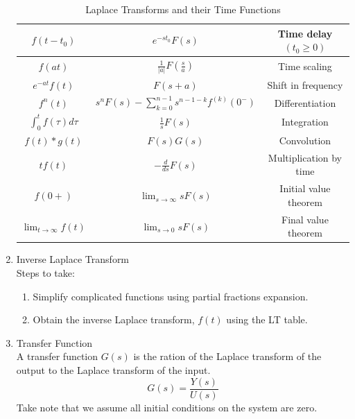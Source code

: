 \documentclass{article}
\begin{document}
\begin{enumerate}
\begin{table}[h]
\begin{center}
\begin{tabular}{|c|c|c|}
    $f(t - t_0)$ & $e^{-st_0}F(s)$ & Time delay $(t_0 \geq 0)$ \\ \hline
    $f(at)$ & $\displaystyle \frac{1}{|a|}F\left(\frac{s}{a}\right)$ & Time scaling  \\ \hline
    $e^{-at}f(t)$ & $F(s + a)$ & Shift in frequency \\ \hline
    $f^n(t)$ & $\displaystyle s^n F(s) - \sum_{k=0}^{n-1}s^{n-1-k}f^{(k)}(0^-)$ & Differentiation \\ \hline
    $\int_{0}^{t} f(\tau)d\tau$ & $\frac{1}{s}F(s)$ & Integration \\ \hline
    $f(t) * g(t)$ & $F(s)G(s)$ & Convolution \\ \hline
    $tf(t)$ & $-\frac{d}{ds}F(s)$ & Multiplication by time \\ \hline
    $f(0+)$ & $\displaystyle \lim_{s\to\infty} sF(s)$ & Initial value theorem \\ \hline
    $\displaystyle \lim_{t\to\infty} f(t)$ & $\displaystyle \lim_{s\to0} sF(s)$ & Final value theorem \\ \hline
    \end{tabular}
    \end{center}
    \caption{Laplace Transforms and their Time Functions}
    \label{table:laplace}
    \end{table}
\item Inverse Laplace Transform\\
Steps to take:
\begin{enumerate}
    \item Simplify complicated functions using partial fractions expansion.
    \item Obtain the inverse Laplace transform, $f(t)$ using the LT table.
\end{enumerate}
\item Transfer Function \\
A transfer function $G(s)$ is the ration of the Laplace transform of the output to the Laplace transform of the input.
\begin{equation}
    G(s) = \frac{Y(s)}{U(s)}
\end{equation}
Take note that we assume all initial conditions on the system are zero.
\end{enumerate}
\end{document}
